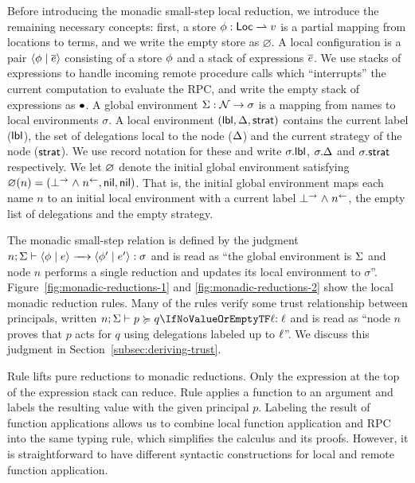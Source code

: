Before introducing the monadic small-step local reduction, we introduce the remaining necessary concepts: first, a store $\phi: \mathsf{Loc} \rightharpoonup v$ is a partial mapping from locations to terms, and we write the empty store as $\varnothing$. A local configuration is a pair $\langle \phi \mid \overline{e} \rangle$ consisting of a store $\phi$ and a stack of expressions $\overline{e}$. We use stacks of expressions to handle incoming remote procedure calls which ``interrupts'' the current computation to evaluate the RPC, and write the empty stack of expressions as $\bullet$. A global environment $\Sigma: \mathcal{N} \to \sigma$ is a mapping from names to local environments $\sigma$. A local environment $(\mathsf{lbl}, \Delta, \mathsf{strat})$ contains the current label ($\mathsf{lbl}$), the set of delegations local to the node ($\Delta$) and the current strategy of the node ($\mathsf{strat}$). We use record notation for these and write $\sigma.\mathsf{lbl}$, $\sigma.\Delta$ and $\sigma.\mathsf{strat}$ respectively. We let $\varnothing$ denote the initial global environment satisfying $\varnothing(n) = (\bot^{\rightarrow} \mathrel{\land} n^{\leftarrow}, \mathsf{nil}, \mathsf{nil})$. That is, the initial global environment maps each name $n$ to an initial local environment with a current label $\bot^{\rightarrow} \mathrel{\land} n^{\leftarrow}$, the empty list of delegations and the empty strategy.

The monadic small-step relation is defined by the judgment $\step{n; \env}{\config{\store}{\expr}}{\config{\store'}{\expr'}}{\sigma}$ and is read as ``the global environment is $\Sigma$ and node $n$ performs a single reduction and updates its local environment to $\sigma$''. Figure~\ref{fig:monadic-reductions-1} and \ref{fig:monadic-reductions-2} show the local monadic reduction rules. Many of the rules verify some trust relationship between principals, written $\actsforquery{n; \env}{p}{q}{\level}$ and is read as ``node $n$ proves that $p$ acts for $q$ using delegations labeled up to $\ell$''. We discuss this judgment in Section~\ref{subsec:deriving-trust}.

Rule  lifts pure reductions to monadic reductions. Only the expression at the top of the expression stack can reduce. Rule  applies a function to an argument and labels the resulting value with the given principal $p$. Labeling the result of function applications allows us to combine local function application and RPC into the same typing rule, which simplifies the calculus and its proofs. However, it is straightforward to have different syntactic constructions for local and remote function application.

